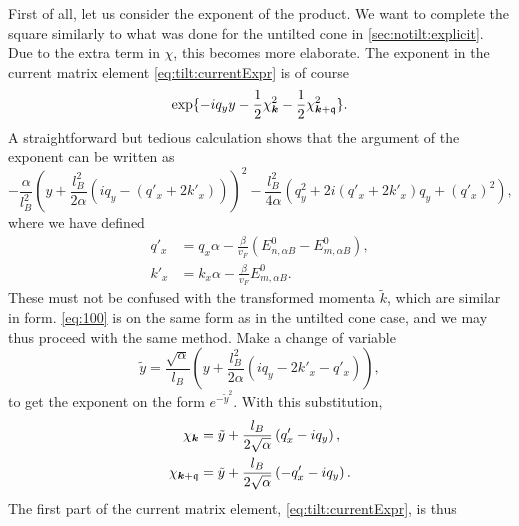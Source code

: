 First of all, let us consider the exponent of the product.
We want to complete the square similarly to what was done for the untilted cone in \cref{sec:notilt:explicit}.
Due to the extra term in \(\chi\), this becomes more elaborate.
The exponent in the current matrix element \cref{eq:tilt:currentExpr} is of course
\begin{equation}
  \label{eq:99}
  \exp\{-i q_{y} y - \frac{1}{2} \chi_{\bm{k}} ^2 - \frac{1}{2} \chi _{\bm{k} + \mathfrak{q}}^2\}.
\end{equation}
A straightforward but tedious calculation shows that the argument of the exponent can be written as
\begin{equation}
  \label{eq:100}
  -\frac{\alpha}{l_{B}^2} \left(y + \frac{l_{B}^2}{2 \alpha } (i q_{y} - (q'_x + 2 k'_x))\right)^2
  -\frac{l_{B}^2}{4 \alpha } (q_{y}^2 + 2i (q'_x + 2 k'_x) q_{y} + ( q' _{x} )^2 ),
\end{equation}
where we have defined
\begin{align}
  \label{eq:qkprime}
  q' _x &= q_x \alpha  - \frac{\beta}{v_{F} }( E^0_{n,\alpha B} - E^0_{m, \alpha B} ),\\
  k' _x &= k_x\alpha - \frac{\beta}{v_F } E^0_{m, \alpha B}.
\end{align}
These must not be confused with the transformed momenta \( \tilde{k} \), which are similar in form.
\cref{eq:100} is on the same form as in the untilted cone case, and we may thus proceed with the same method.
Make a change of variable
\[
\tilde{y} = \frac{\sqrt{\alpha }}{l_{B}} \left(y + \frac{l_{B}^2}{2\alpha } (iq_{y} - 2 k' _x - q' _x )\right),
\]
to get the exponent on the form \(e^{-\tilde{y}^2}\).
With this substitution,
\begin{align}
  \chi _{\bm{k}} &= \tilde{y} + \frac{l_{B}}{2 \sqrt{\alpha }} \left(q' _x - i q_{y}\right),\\
  \chi _{\bm{k} + \mathfrak{q}} &= \tilde{y} + \frac{l_{B}}{2 \sqrt{\alpha }} \left(- q' _x - i q_{y}\right).
\end{align}
The first part of the current matrix element, \cref{eq:tilt:currentExpr}, is thus
